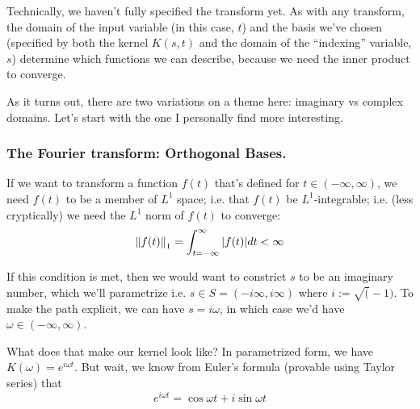 \documentclass[letterpaper,12pt]{report}
\begin{document}
Technically, we haven't fully specified the transform yet.
As with any transform, the domain of the input variable 
(in this case, \(t\)) and the basis we've chosen
(specified by both the kernel \(K(s,t)\) and the domain of
the ``indexing'' variable, \(s\)) determine which functions
we can describe, because we need the inner product 
 to converge.\par

As it turns out, there are two variations on a theme here:
imaginary vs complex domains.
Let's start with the one I personally find more interesting.

\subsubsection{The Fourier transform: Orthogonal Bases.}

If we want to transform a function \(f(t)\) that's defined
for \(t \in (-\infty, \infty)\), we need \(f(t)\) to be a member
of \(L^1\) space; i.e. that \(f(t)\) be \(L^1\)-integrable; 
i.e. (less cryptically) we need the \(L^1\) norm of \(f(t)\)
to converge:
\[\norm{f(t)}_1 = 
  \int_{t=-\infty}^{\infty} \abs{f(t)} dt < \infty \]

If this condition is met, then we would want to constrict
\(s\) to be an imaginary number, which we'll parametrize
i.e. \(s \in S = (-i\infty, i\infty)\) 
where \(i := \sqrt(-1)\).
To make the path explicit, we can have \(s = i\omega\),
in which case we'd have \(\omega \in (-\infty, \infty)\).\par

What does that make our kernel look like?
In parametrized form, we have \(K(\omega) = e^{i\omega t}\).
But wait, we know from Euler's formula
(provable using Taylor series) that
\[e^{i\omega t} = \cos{\omega t} + i\sin{\omega t} \]
\end{document}
